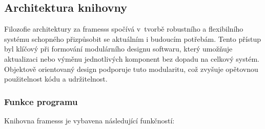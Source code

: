 \subsection{Architektura knihovny}

Filozofie architektury za framesss spočívá v~tvorbě robustního a flexibilního systému schopného přizpůsobit se aktuálním i budoucím potřebám. Tento přístup byl klíčový při formování modulárního designu softwaru, který umožňuje aktualizaci nebo výměnu jednotlivých komponent bez dopadu na celkový systém. Objektově orientovaný design podporuje tuto modularitu, což zvyšuje opětovnou použitelnost kódu a udržitelnost.

\subsubsection{Funkce programu}

Knihovna framesss je vybavena následující funkčností:


